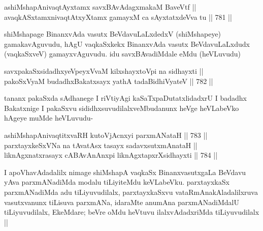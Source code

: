 
\begin{shl}
ashiMshapAnivaqtAyxtamx savxBAvAdagxmakaM BaveVtf || \\
avaqkASxtamxnivaqtAtxyXtamx gamayxM ca sAyxtatxdeVva tu ||  781 ||  
\end{shl}

\begin{artha}
shiMshapage BinanxvAda vasutx BeVdavuLaLxdedxV (shiMshapeye) gamakavAguvudu, hAgU vaqkaSxkekx BinanxvAda vasutx BeVdavuLaLxdudx (vaqkaSxveV) gamayxvAguvudu. idu savxBAvadiMdale eMdu (heVLuvudu)
\end{artha}


\begin{shl}
savxpakaSxsidadhxyeV\s peyxVvaM kilxshayxtoV\s pi na sidhayxti ||  \\
pakoSxV\s yaM budadhxBakatxsayx yathA tadaBidhiVyateV ||  782 ||  
\end{shl}

\begin{artha}
tananx pakaSxda sAdhanege I riVtiyAgi kaSaTxpaDutatxlidadxrU I badadhx Bakatxnige I pakaSxvu sididhxsuvudilalxveMbudanunx heVge heVLabeVko hAgeye muMde heVLuvudu-
\end{artha}


\begin{shl}
ashiMshapAnivaqtitxvaRH kutoV\s jAcnxyi parxmANataH ||  783 || \\
parxtayxkeSxVNa na tAvatAsx tasayx sadavxsutxmAnataH || \\
liknAgxnatxrasayx cABAvAnAnxpi liknAgxtapxrXsidhayxti ||  784 ||  
\end{shl}

\begin{artha}
I apoVhavAdadalilx nimage shiMshapA vaqkaSx BinanxvasutxgaLa BeVdavu yAva parxmANadiMda modalu tiLiyiteMdu keVLabeVku. parxtayxkaSx parxmANadiMda adu tiLiyuvudilalx, parxtayxkaSxvu vataRmAnakAladalilxruva vasutxvanunx tiLisuva parxmANa, idaraMte anumAna parxmANadiMdalU tiLiyuvudilalx, EkeMdare; beVre oMdu heVtuvu ilalxvAdadxriMda tiLiyuvudilalx ||
\end{artha}



